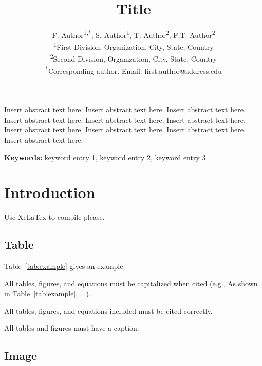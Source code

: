 \documentclass[12pt]{article}
\title{\articletype{Article Type} Title}
\author{F. Author\textsuperscript{1,*}, S. Author\textsuperscript{1}, T. Author\textsuperscript{2}, F.T. Author\textsuperscript{2} \\
{\footnotesize \textsuperscript{1}First Division, Organization, City, State, Country} \\
{\footnotesize \textsuperscript{2}Second Division, Organization, City, State, Country} \\
{\footnotesize \textsuperscript{*}Corresponding author. Email: first.author@address.edu}}
\date{}
\renewenvironment{abstract}
  {\begin{mdframed}[
    backgroundcolor=gray!20, 
    innertopmargin=10pt, 
    innerbottommargin=15pt, 
    innerleftmargin=15pt, 
    innerrightmargin=15pt, 
    linewidth=0pt, 
    roundcorner=0pt,
    frametitleaboveskip=5mm, 
    frametitlebelowskip=-1mm, 
    frametitle={\bfseries Abstract}, 
    frametitlefont={\bfseries},
    frametitlealignment=\raggedright
    ]
   \vspace{2mm}}
  {\end{mdframed}}
\newcommand{\keywords}[1]{
  \vspace{12pt} 
  \par\noindent\textbf{Keywords:} #1
}
\begin{document}
\maketitle
\thispagestyle{firstpage}


\begin{abstract}
Insert abstract text here. Insert abstract text here. Insert abstract text here. Insert abstract text here. Insert abstract text here. Insert abstract text here. Insert abstract text here. Insert abstract text here. Insert abstract text here. Insert abstract text here.
\end{abstract}

\keywords{keyword entry 1, keyword entry 2, keyword entry 3}


\newpage

\section{Introduction}
Use XeLaTex to compile please.

\subsection{Table}


Table~\ref{tab:example} gives an example. 

All tables, figures, and equations must be capitalized when cited (e.g., As shown in Table~\ref{tab:example}, ...).

All tables, figures, and equations included must be cited correctly. 

All tables and figures must have a caption.

\begin{table}[hbt!]
  \caption{Example table}
  \centering
  \label{tab:example}
\end{table}


\subsection{Image}
\end{document}
